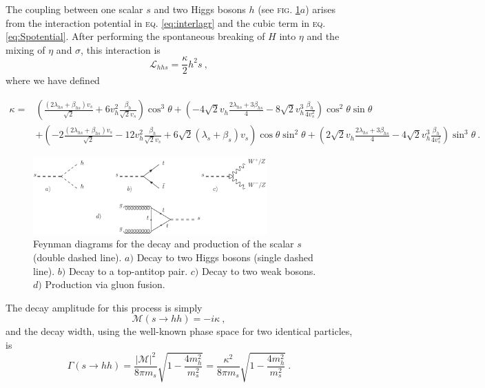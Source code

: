 \documentclass[aps,prd,preprintnumbers,nofootinbibn,twocolumn]{revtex4}
\begin{document}
The coupling between one scalar $s$ and two Higgs bosons $h$ (see \textsc{fig.} \ref{fig:diagrams}$a$) arises from the interaction potential in \textsc{eq.} \eqref{eq:interlagr} and the cubic term in \textsc{eq.} \eqref{eq:Spotential}. After performing the spontaneous breaking of $H$ into $\eta$ and the mixing of $\eta$ and $\sigma$, this interaction is
\begin{equation}
\mathcal{L}_{hhs} = \frac{\kappa}{2} h^2 s\ ,
\end{equation}
where we have defined
\begin{widetext}
\begin{align}
\kappa =& \left(\frac{(2\lambda_{hs} + \beta_{hs})v_s}{\sqrt{2}} + 6 v_h^2\frac{\beta_h}{\sqrt{2} v_s} \right)\cos^3 \theta %
+ \left(-4\sqrt{2}v_h \frac{2\lambda_{hs} + 3\beta_{hs}}{4} - 8\sqrt{2}v_h^3  \frac{\beta_h}{4 v_s^2} \right)\cos^2\theta \sin \theta \\
&+ \left(-2\frac{(2\lambda_{hs} + \beta_{hs})v_s}{\sqrt{2}} -12 v_h^2\frac{\beta_h}{\sqrt{2} v_s} +6\sqrt{2}(\lambda_s+\beta_s) v_s \right)\cos\theta \sin^2\theta %
+\left(2\sqrt{2}v_h \frac{2\lambda_{hs} + 3\beta_{hs}}{4} -4\sqrt{2}v_h^3 \frac{\beta_h}{4 v_s^2} \right)\sin^3\theta\ . \nonumber
\end{align}
\end{widetext}

\begin{figure}[t]
\centering
\includegraphics[width=0.8\textwidth]{diagrams}
\caption{Feynman diagrams for the decay and production of the scalar $s$ (double dashed line). $a)$ Decay to two Higgs bosons (single dashed line). $b)$ Decay to a top-antitop pair. $c)$ Decay to two weak bosons. $d)$ Production via gluon fusion.}\label{fig:diagrams}
\end{figure}

The decay amplitude for this process is simply
\begin{equation}
\mathcal{M}(s\to hh)= -i \kappa\ ,
\end{equation}
and the decay width, using the well-known phase space for two identical particles, is
\begin{equation}
\Gamma(s\to hh) = \frac{|\mathcal{M}|^2}{8\pi m_s}\sqrt{1-\frac{4m_h^2}{m_s^2}} = \frac{\kappa^2}{8\pi m_s}\sqrt{1-\frac{4m_h^2}{m_s^2}}\ .
\end{equation}
\end{document}
